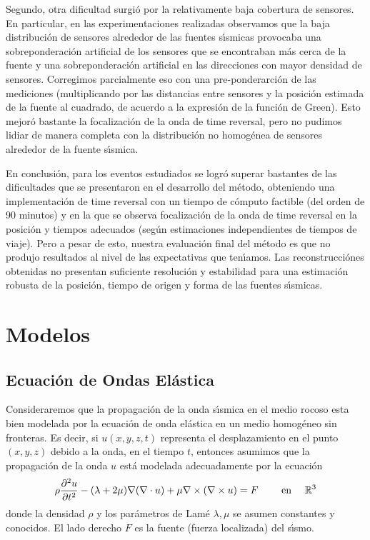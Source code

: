 Segundo, otra dificultad surgi\'o por la relativamente baja cobertura de sensores. En particular,
en las experimentaciones realizadas
observamos que la baja distribuci\'on de sensores alrededor
de las fuentes s\'{\i}smicas provocaba una sobreponderaci\'on artificial de los
sensores que se encontraban m\'as cerca de la fuente y una sobreponderaci\'on
artificial en las direcciones con mayor densidad de sensores. Corregimos parcialmente
eso con una pre-ponderarci\'on de las mediciones (multiplicando por las distancias
entre sensores y la posici\'on estimada de la fuente al cuadrado, de acuerdo a
 la expresi\'on de la funci\'on de Green). Esto mejor\'o bastante la focalizaci\'on de
la onda de time reversal, pero no pudimos lidiar de manera completa con la distribuci\'on
no homog\'enea de sensores alrededor de la fuente s\'{\i}smica.

En conclusi\'on, para  los eventos estudiados se logr\'o superar bastantes de las dificultades
que se presentaron en el desarrollo del m\'etodo, obteniendo una implementaci\'on de time
reversal con un tiempo de c\'omputo factible (del orden de 90 minutos) y en
la que se observa
focalizaci\'on de la onda de time reversal en la
posici\'on y tiempos adecuados (seg\'un estimaciones independientes de tiempos
de viaje). Pero a pesar de esto, nuestra evaluaci\'on final del m\'etodo es que no
produjo resultados al nivel de las expectativas que ten\'{\i}amos. Las reconstrucci\'ones
obtenidas no presentan suficiente resoluci\'on y estabilidad para una
estimaci\'on robusta de
la posici\'on, tiempo de origen y forma de las fuentes s\'{\i}smicas.


\section{Modelos}

\subsection{Ecuaci\'on de Ondas El\'astica}

Consideraremos que la propagaci\'on de la onda s\'{\i}smica en
el medio rocoso esta bien modelada por la ecuaci\'on de onda
el\'astica en un medio homog\'eneo sin fronteras.
Es decir, si $u(x,y,z,t)$ representa el desplazamiento en el punto
$(x,y,z)$ debido a la onda, en el tiempo $t$, entonces asumimos
que la propagaci\'on de la onda $u$ est\'a modelada adecuadamente
por la ecuaci\'on
\begin{align}\label{eqn:elasticwave}
\rho\frac{\partial^2 u}{\partial t^2}-(\lambda+2\mu)\nabla(\nabla\cdot u)+\mu\nabla\times(\nabla\times u)=F \qquad\textnormal{ en } \quad\mathbb{R}^3
\end{align}
donde la densidad $\rho$ y los par\'ametros de Lam\'e $\lambda,\mu$ se asumen constantes 
y conocidos. El lado derecho $F$ es la fuente (fuerza localizada) del s\'{\i}smo.


